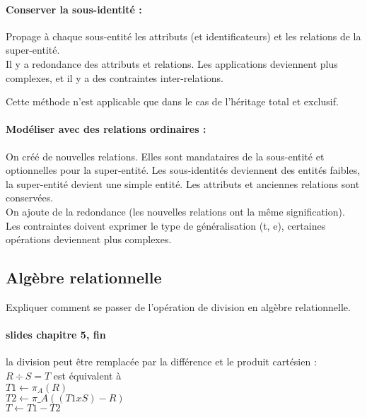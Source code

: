 \paragraph{Conserver la sous-identité :} Propage à chaque sous-entité les attributs 
(et identificateurs) et les relations de la super-entité.\\
Il y a redondance des attributs et relations. Les applications deviennent plus 
complexes, et il y a des contraintes inter-relations.

Cette méthode n'est applicable que dans le cas de l'héritage total et exclusif.

\paragraph{Modéliser avec des relations ordinaires :}
On créé de nouvelles relations. Elles sont mandataires de la sous-entité et 
optionnelles pour la super-entité.
Les sous-identités deviennent des entités faibles, la super-entité devient 
une simple entité.
Les attributs et anciennes relations sont conservées.\\

On ajoute de la redondance (les nouvelles relations ont la m\^eme signification).
Les contraintes doivent exprimer le type de généralisation (t, e), 
certaines opérations deviennent plus complexes.

\subsection{Algèbre relationnelle}
Expliquer comment se passer de l'opération de division en algèbre relationnelle.

\paragraph{slides chapitre 5, fin}
la division peut être remplacée par la différence et le produit cartésien :
$R \div S = T$ est équivalent à \\
$T1 \leftarrow \pi_{A}(R)$\\
$T2 \leftarrow \pi\_{A}((T1 x S) -R)$\\
$T \leftarrow T1 - T2 $\\


